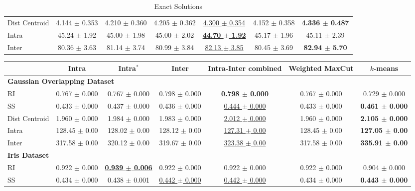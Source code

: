 \documentclass[showpacs,twocolumn,superscriptaddress]{revtex4-2}
\begin{document}
\begin{table*}[!ht]
\begin{tabular}{lcccccc}
    Dist Centroid & 4.144 $\pm$ 0.353 & 4.210 $\pm$ 0.360 & 4.205 $\pm$ 0.362 & \underline{4.300 $\pm$ 0.354} & 4.152 $\pm$ 0.358 & \textbf{4.336 $\pm$ 0.487} \\
    Intra & 45.24 $\pm$ 1.92 & 45.00 $\pm$ 1.98 & 45.00 $\pm$ 2.02 & \underline{\textbf{44.70 $\pm$ 1.92}} & 45.17 $\pm$ 1.96 & 45.11 $\pm$ 2.39 \\
    Inter & 80.36 $\pm$ 3.63 & 81.14 $\pm$ 3.74 & 80.99 $\pm$ 3.84 & \underline{82.13 $\pm$ 3.85} & 80.45 $\pm$ 3.69 & \textbf{82.94 $\pm$ 5.70} \\
    \bottomrule
    \end{tabular}
    \caption{Exact Solutions}
\end{table*}

\begin{table*}[!ht]
    \centering
    \fontsize{9}{11}\selectfont
    \begin{tabular}{lcccccc}
    \toprule
      & Intra & Intra$^*$ & Inter & Intra-Inter combined & Weighted MaxCut & $k$-means \\
    \midrule
    \multicolumn{7}{l}{\textbf{Gaussian Overlapping Dataset}} \\
    RI & 0.767 $\pm$ 0.000 & 0.767 $\pm$ 0.000 & 0.798 $\pm$ 0.000 & \underline{\textbf{0.798 $\pm$ 0.000}} & 0.767 $\pm$ 0.000 & 0.729 $\pm$ 0.000 \\
    SS & 0.433 $\pm$ 0.000 & 0.437 $\pm$ 0.000 & 0.436 $\pm$ 0.000 & \underline{0.444 $\pm$ 0.000} & 0.433 $\pm$ 0.000 & \textbf{0.461 $\pm$ 0.000} \\
    Dist Centroid & 1.960 $\pm$ 0.000 & 1.984 $\pm$ 0.000 & 1.983 $\pm$ 0.000 & \underline{2.012 $\pm$ 0.000} & 1.960 $\pm$ 0.000 & \textbf{2.105 $\pm$ 0.000} \\
    Intra & 128.45 $\pm$ 0.00 & 128.02 $\pm$ 0.00 & 128.12 $\pm$ 0.00 & \underline{127.31 $\pm$ 0.00} & 128.45 $\pm$ 0.00 & \textbf{127.05 $\pm$ 0.00} \\
    Inter & 317.58 $\pm$ 0.00 & 320.12 $\pm$ 0.00 & 319.67 $\pm$ 0.00 & \underline{323.38 $\pm$ 0.00} & 317.58 $\pm$ 0.00 & \textbf{335.91 $\pm$ 0.00} \\
    \midrule
    \multicolumn{7}{l}{\textbf{Iris Dataset}} \\
    RI & 0.922 $\pm$ 0.000 & \underline{\textbf{0.939 $\pm$ 0.006}} & 0.922 $\pm$ 0.000 & 0.922 $\pm$ 0.000 & 0.922 $\pm$ 0.000 & 0.904 $\pm$ 0.000 \\
    SS & 0.434 $\pm$ 0.000 & 0.438 $\pm$ 0.001 & \underline{0.442 $\pm$ 0.000} & \underline{0.442 $\pm$ 0.000} & 0.434 $\pm$ 0.000 & \textbf{0.443 $\pm$ 0.000} \\

\end{tabular}
\end{table*}
\end{document}
